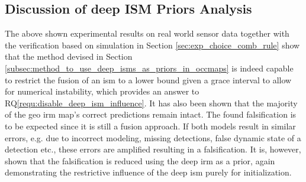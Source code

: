 \subsection{Discussion of deep ISM Priors Analysis}
\label{subsec:discussion_of_prior_analy}
The above shown experimental results on real world sensor data together with the verification based on simulation in Section \ref{sec:exp_choice_comb_rule} show that the method devised in Section \ref{subsec:method_to_use_deep_isms_as_priors_in_occmaps} is indeed capable to restrict the fusion of an \gls{ism} to a lower bound given a grace interval to allow for numerical instability, which provides an answer to RQ\ref{requ:disable_deep_ism_influence}. It has also been shown that the majority of the geo \gls{irm} map's correct predictions remain intact. The found falsification is to be expected since it is still a fusion approach. If both models result in similar errors, e.g. due to incorrect modeling, missing detections, false dynamic state of a detection etc., these errors are amplified resulting in a falsification. It is, however, shown that the falsification is reduced using the deep \gls{irm} as a prior, again demonstrating the restrictive influence of the deep \gls{ism} purely for initialization.